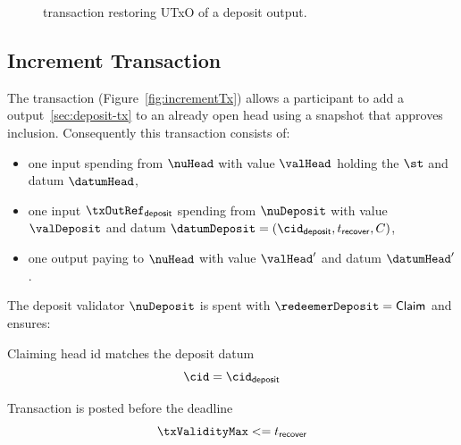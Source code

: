 \begin{figure}[H]
	\centering
	
	\caption{\mtxRecover{} transaction restoring UTxO of a deposit
		output.}\label{fig:recoverTx}
\end{figure}

\subsection{Increment Transaction}\label{sec:increment-tx}

\noindent The \mtxIncrement{} transaction (Figure~\ref{fig:incrementTx}) allows
a participant to add a \mtxDeposit{} output~\ref{sec:deposit-tx} to an already
open head using a snapshot that approves inclusion. Consequently this
transaction consists of:

\begin{itemize}
	\item one input spending from $\nuHead$ with value $\valHead$ holding the
	      $\st$ and datum $\datumHead$,
	\item one input $\txOutRef_{\mathsf{deposit}}$ spending from $\nuDeposit$ with value $\valDeposit$ and datum
	      $\datumDeposit = (\cid_{\mathsf{deposit}}, t_{\mathsf{recover}}, C)$,
	\item one output paying to $\nuHead$ with value $\valHead'$ and datum
	      $\datumHead'$.
\end{itemize}

\noindent The deposit validator $\nuDeposit$ is spent with
$\redeemerDeposit = \mathsf{Claim}$ and ensures:
\begin{menumerate}
	\item Claiming head id matches the deposit datum
	\[
		\cid = \cid_{\mathsf{deposit}}
	\]
	\item Transaction is posted before the deadline
	\[
		\txValidityMax <= t_{\mathsf{recover}}
	\]
\end{menumerate}

